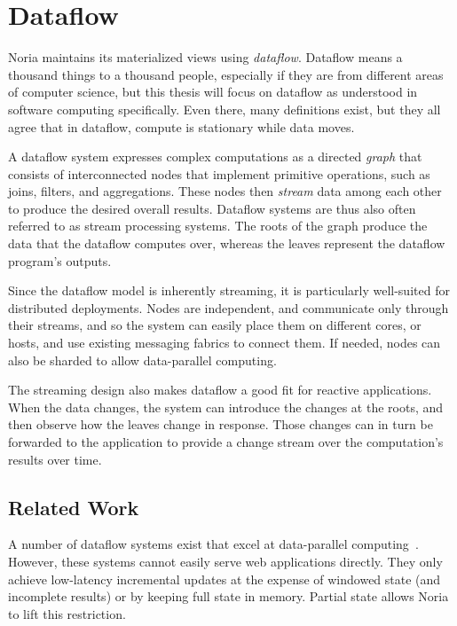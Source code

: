 \section{Dataflow}

Noria maintains its materialized views using \textit{dataflow}. Dataflow means a
thousand things to a thousand people, especially if they are from different
areas of computer science, but this thesis will focus on dataflow as understood
in software computing specifically. Even there, many definitions exist, but they
all agree that in dataflow, compute is stationary while data moves.

A dataflow system expresses complex computations as a directed \emph{graph} that
consists of interconnected nodes that implement primitive operations, such as
joins, filters, and aggregations. These nodes then \emph{stream} data among each
other to produce the desired overall results. Dataflow systems are thus also
often referred to as stream processing systems. The roots of the graph produce
the data that the dataflow computes over, whereas the leaves represent the
dataflow program's outputs.

Since the dataflow model is inherently streaming, it is particularly well-suited
for distributed deployments. Nodes are independent, and communicate only through
their streams, and so the system can easily place them on different cores, or
hosts, and use existing messaging fabrics to connect them. If needed, nodes can
also be sharded to allow data-parallel computing.

The streaming design also makes dataflow a good fit for reactive applications.
When the data changes, the system can introduce the changes at the roots, and
then observe how the leaves change in response. Those changes can in turn be
forwarded to the application to provide a change stream over the computation's
results over time.

\subsection{Related Work}

\resume

A number of dataflow systems exist that excel at data-parallel
computing~\cite{dryad, naiad}. However, these systems cannot easily serve web
applications directly. They only achieve low-latency incremental updates at the
expense of windowed state (and incomplete results) or by keeping full state in
memory. Partial state allows Noria to lift this restriction.

